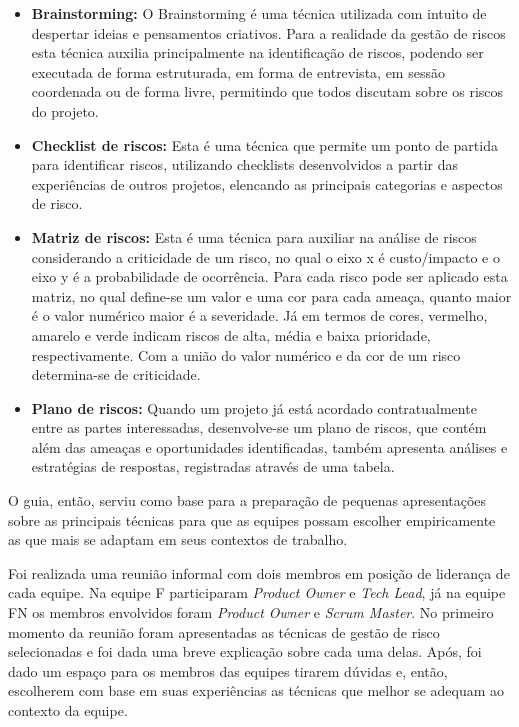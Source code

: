 \documentclass[
    12pt,       %
    openright,      %
    twoside,      %
    a4paper,      %
    english,      %
    french,       %
    spanish,      %
    brazil,       %
    ]{abntex2}
\begin{document}
\begin{itemize}
    \item \textbf{Brainstorming:} O Brainstorming é uma técnica utilizada com intuito de despertar ideias e pensamentos criativos. Para a realidade da gestão de riscos esta técnica auxilia principalmente na identificação de riscos, podendo ser executada de forma estruturada, em forma de entrevista, em sessão coordenada ou de forma livre, permitindo que todos discutam sobre os riscos do projeto.
    \item \textbf{Checklist de riscos:} Esta é uma técnica que permite um ponto de partida para identificar riscos, utilizando checklists desenvolvidos a partir das experiências de outros projetos, elencando as principais categorias e aspectos de risco.
    \item \textbf{Matriz de riscos:} Esta é uma técnica para auxiliar na análise de riscos considerando a criticidade de um risco, no qual o eixo x é custo/impacto e o eixo y é a probabilidade de ocorrência. Para cada risco pode ser aplicado esta matriz, no qual define-se um valor e uma cor para cada ameaça, quanto maior é o valor numérico maior é a severidade. Já em termos de cores, vermelho, amarelo e verde indicam riscos de alta, média e baixa prioridade, respectivamente. Com a união do valor numérico e da cor de um risco determina-se de criticidade.
    \item \textbf{Plano de riscos:} Quando um projeto já está acordado contratualmente entre as partes interessadas, desenvolve-se um plano de riscos, que contém além das ameaças e oportunidades identificadas, também apresenta análises e estratégias de respostas, registradas através de uma tabela.
\end{itemize}

O guia, então, serviu como base para a preparação de pequenas apresentações sobre as principais técnicas para que as equipes possam escolher empiricamente as que mais se adaptam em seus contextos de trabalho.

Foi realizada uma reunião informal com dois membros em posição de liderança de cada equipe. Na equipe F participaram \textit{Product Owner} e \textit{Tech Lead}, já na equipe FN os membros envolvidos foram \textit{Product Owner} e \textit{Scrum Master}. No primeiro momento da reunião foram apresentadas as técnicas de gestão de risco selecionadas e foi dada uma breve explicação sobre cada uma delas. Após, foi dado um espaço para os membros das equipes tirarem dúvidas e, então, escolherem com base em suas experiências as técnicas que melhor se adequam ao contexto da equipe. 
\end{document}
